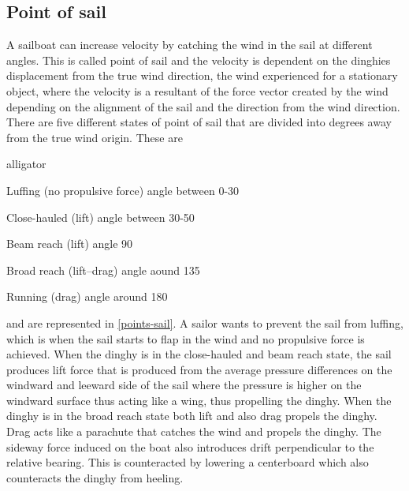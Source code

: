 \subsection{Point of sail}
A sailboat can increase velocity by catching the wind in the sail at different angles. This is called point of sail and the velocity is dependent on the dinghies displacement from the true wind direction, the wind experienced for a stationary object, where the velocity is a resultant of the force vector created by the wind depending on the alignment of the sail and the direction from the wind direction. There are five different states of point of sail that are divided into degrees away from the true wind origin. These are
\begin{labeling}{alligator}
\item [Luffing] (no propulsive force) angle between 0-30\degree
\item [Close-hauled] (lift) angle between 30-50\degree
\item [Beam reach] (lift) angle 90\degree
\item [Broad reach] (lift–drag) angle aound 135\degree
\item [Running] (drag) angle around 180\degree
\end{labeling}
and are represented in \autoref{points-sail}. A sailor wants to prevent the sail from luffing, which is when the sail starts to flap in the wind and no propulsive force is achieved. When the dinghy is in the close-hauled and beam reach state, the sail produces lift force that is produced from the average pressure differences on the windward and leeward side of the sail where the pressure is higher on the windward surface thus acting like a wing, thus propelling the dinghy. When the dinghy is in the broad reach state both lift and also drag propels the dinghy. Drag acts like a parachute that catches the wind and propels the dinghy. The sideway force induced on the boat also introduces drift perpendicular to the relative bearing. This is counteracted by lowering a centerboard which also counteracts the dinghy from heeling.
